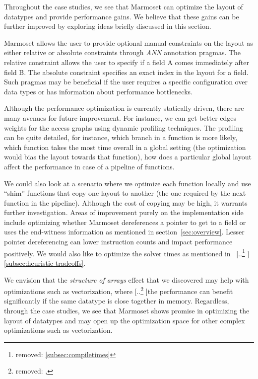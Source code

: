 \documentclass[acmsmall,review,anonymous]{acmart}\settopmatter{printfolios=true,printccs=false,printacmref=false}
\newcommand{\system}{{\sc Marmoset}\xspace}
\providecommand{\DIFaddtex}[1]{{\protect\color{blue} \sf #1}} %
\providecommand{\DIFdeltex}[1]{{\protect\color{red} [..\footnote{removed: #1} ]}} %
\providecommand{\DIFaddbegin}{} %
\providecommand{\DIFaddend}{} %
\providecommand{\DIFdelbegin}{} %
\providecommand{\DIFdelend}{} %
\providecommand{\DIFadd}[1]{\texorpdfstring{\DIFaddtex{#1}}{#1}} %
\providecommand{\DIFdel}[1]{\texorpdfstring{\DIFdeltex{#1}}{}} %
\newcommand{\DIFscaledelfig}{0.5}
\newlength{\DIFdelgraphicswidth} %
\newlength{\DIFdelgraphicsheight} %
\newcommand{\DIFaddincludegraphics}[2][]{{\color{blue}\fbox{\DIFOincludegraphics[#1]{#2}}}} %
\newcommand{\DIFdelincludegraphics}[2][]{%
\sbox{\DIFdelgraphicsbox}{\DIFOincludegraphics[#1]{#2}}%
\settoboxwidth{\DIFdelgraphicswidth}{\DIFdelgraphicsbox} %
\settoboxtotalheight{\DIFdelgraphicsheight}{\DIFdelgraphicsbox} %
\scalebox{\DIFscaledelfig}{%
\parbox[b]{\DIFdelgraphicswidth}{\usebox{\DIFdelgraphicsbox}\\[-\baselineskip] \rule{\DIFdelgraphicswidth}{0em}}\llap{\resizebox{\DIFdelgraphicswidth}{\DIFdelgraphicsheight}{%
\setlength{\unitlength}{\DIFdelgraphicswidth}%
\begin{picture}(1,1)%
\thicklines\linethickness{2pt} %
{\color[rgb]{1,0,0}\put(0,0){\framebox(1,1){}}}%
{\color[rgb]{1,0,0}\put(0,0){\line( 1,1){1}}}%
{\color[rgb]{1,0,0}\put(0,1){\line(1,-1){1}}}%
\end{picture}%
}\hspace*{3pt}}} %
} %
\DeclareRobustCommand{\DIFaddbegin}{\DIFOaddbegin \let\includegraphics\DIFaddincludegraphics} %
\DeclareRobustCommand{\DIFaddend}{\DIFOaddend \let\includegraphics\DIFOincludegraphics} %
\DeclareRobustCommand{\DIFdelbegin}{\DIFOdelbegin \let\includegraphics\DIFdelincludegraphics} %
\DeclareRobustCommand{\DIFdelend}{\DIFOaddend \let\includegraphics\DIFOincludegraphics} %
\begin{document}
Throughout the case studies, we see that \system
can optimize the layout of datatypes and provide performance gains. We
believe that these gains can be further improved by exploring ideas briefly discussed
in this section.

\system allows the user to provide optional manual constraints on the layout
as either relative or absolute constraints through \textit{ANN} annotation pragmas.
The relative constraint allows the user to specify if a field A comes immediately after
field B. The absolute constraint specifies an exact index in the layout for a field. 
Such pragmas may be beneficial if the user requires a specific configuration over data
types or has information about performance bottlenecks.


Although the performance optimization is currently statically driven, there are many avenues for future
improvement. For instance, we can get better edges weights for the access graphs
using dynamic profiling techniques. The profiling can be quite detailed, for
instance, which branch in a function is more likely, which function takes the
most time overall in a global setting (the optimization would bias the layout
towards that function), how does a particular global layout affect the
performance in case of a pipeline of functions.

We could also look at a scenario where we optimize each function locally and 
use ``shim'' functions that copy one layout to another (the one required by the
next function in the pipeline). Although the cost of copying may be high, it warrants
further investigation. Areas of improvement purely on the implementation side include 
optimizing whether \system dereferences a pointer to get to a field or uses the end-witness
information as mentioned in section~\ref{sec:overview}. Lesser pointer dereferencing 
can lower instruction counts and impact performance positively. We would also like to 
optimize the solver times as mentioned in~\DIFdelbegin \DIFdel{\ref{subsec:compiletimes}}\DIFdelend \DIFaddbegin \DIFadd{\ref{subsec:heuristic-tradeoffs}}\DIFaddend .

We envision that the \textit{structure of arrays} effect that we discovered may help 
with optimizations such as vectorization, where \DIFdelbegin \DIFdel{, }\DIFdelend the performance can benefit significantly
if the same datatype is close together in memory. Regardless, through the case studies, we see 
that \system shows promise in optimizing the layout of datatypes and may open up 
the optimization space for other complex optimizations such as vectorization.
\end{document}
